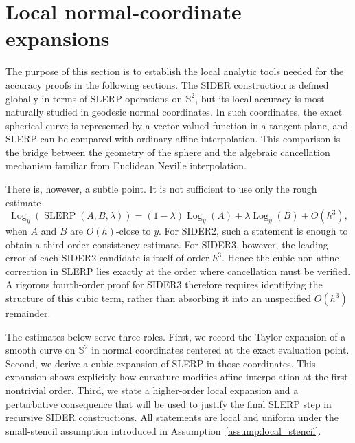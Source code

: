 \documentclass[a4paper,11pt]{article}
\newcommand{\bS}{\mathbb{S}}
\newcommand{\Log}{\operatorname{Log}}
\newcommand{\SLERP}{\operatorname{SLERP}}
\numberwithin{equation}{section}
\begin{document}
\section{Local normal-coordinate expansions}

The purpose of this section is to establish the local analytic tools needed for
the accuracy proofs in the following sections.  The SIDER construction is
defined globally in terms of SLERP operations on \(\bS^2\), but its local
accuracy is most naturally studied in geodesic normal coordinates.  In such
coordinates, the exact spherical curve is represented by a vector-valued
function in a tangent plane, and SLERP can be compared with ordinary affine
interpolation.  This comparison is the bridge between the geometry of the
sphere and the algebraic cancellation mechanism familiar from Euclidean
Neville interpolation.

There is, however, a subtle point.  It is not sufficient to use only the
rough estimate
\[
        \Log_y(\SLERP(A,B,\lambda))
        =
        (1-\lambda)\Log_y(A)+\lambda\Log_y(B)+O(h^3),
\]
when \(A\) and \(B\) are \(O(h)\)-close to \(y\).  For SIDER2, such a statement
is enough to obtain a third-order consistency estimate.  For SIDER3, however,
the leading error of each SIDER2 candidate is itself of order \(h^3\).  Hence
the cubic non-affine correction in SLERP lies exactly at the order where
cancellation must be verified.  A rigorous fourth-order proof for SIDER3
therefore requires identifying the structure of this cubic term, rather than
absorbing it into an unspecified \(O(h^3)\) remainder.

The estimates below serve three roles.  First, we record the Taylor expansion
of a smooth curve on \(\bS^2\) in normal coordinates centered at the exact
evaluation point.  Second, we derive a cubic expansion of SLERP in those
coordinates.  This expansion shows explicitly how curvature modifies affine
interpolation at the first nontrivial order.  Third, we state a higher-order
local expansion and a perturbative consequence that will be used to justify
the final SLERP step in recursive SIDER constructions.  All statements are
local and uniform under the small-stencil assumption introduced in
Assumption~\ref{assump:local_stencil}.
\end{document}
